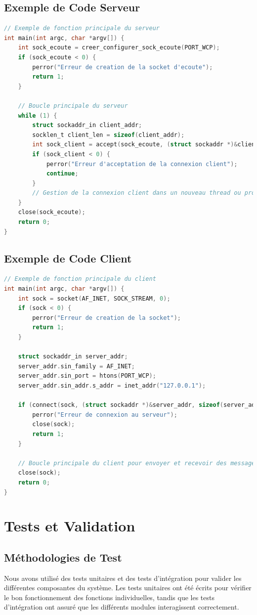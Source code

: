 \documentclass{article}
\begin{document}
\subsection{Exemple de Code Serveur}
\begin{lstlisting}[language=C]
// Exemple de fonction principale du serveur
int main(int argc, char *argv[]) {
    int sock_ecoute = creer_configurer_sock_ecoute(PORT_WCP);
    if (sock_ecoute < 0) {
        perror("Erreur de creation de la socket d'ecoute");
        return 1;
    }

    // Boucle principale du serveur
    while (1) {
        struct sockaddr_in client_addr;
        socklen_t client_len = sizeof(client_addr);
        int sock_client = accept(sock_ecoute, (struct sockaddr *)&client_addr, &client_len);
        if (sock_client < 0) {
            perror("Erreur d'acceptation de la connexion client");
            continue;
        }
        // Gestion de la connexion client dans un nouveau thread ou processus
    }
    close(sock_ecoute);
    return 0;
}
\end{lstlisting}

\subsection{Exemple de Code Client}
\begin{lstlisting}[language=C]
// Exemple de fonction principale du client
int main(int argc, char *argv[]) {
    int sock = socket(AF_INET, SOCK_STREAM, 0);
    if (sock < 0) {
        perror("Erreur de creation de la socket");
        return 1;
    }

    struct sockaddr_in server_addr;
    server_addr.sin_family = AF_INET;
    server_addr.sin_port = htons(PORT_WCP);
    server_addr.sin_addr.s_addr = inet_addr("127.0.0.1");

    if (connect(sock, (struct sockaddr *)&server_addr, sizeof(server_addr)) < 0) {
        perror("Erreur de connexion au serveur");
        close(sock);
        return 1;
    }

    // Boucle principale du client pour envoyer et recevoir des messages
    close(sock);
    return 0;
}
\end{lstlisting}

\section{Tests et Validation}
\subsection{Méthodologies de Test}
Nous avons utilisé des tests unitaires et des tests d'intégration pour valider les différentes composantes du système. Les tests unitaires ont été écrits pour vérifier le bon fonctionnement des fonctions individuelles, tandis que les tests d'intégration ont assuré que les différents modules interagissent correctement.
\end{document}
